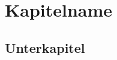 \documentclass[paperheight=5cm,paperwidth=21cm,custompaper,10pt,blue,twoside]{tubsartcl}
\begin{document}
\section{Kapitelname}
\subsection{Unterkapitel}


\end{document}

